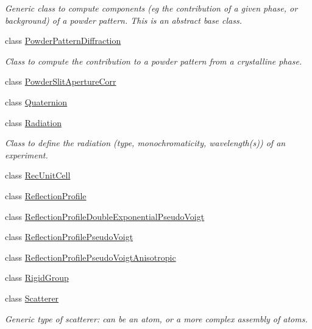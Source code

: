 \begin{DoxyCompactItemize}
\begin{DoxyCompactList}\small\item\em Generic class to compute components (eg the contribution of a given phase, or background) of a powder pattern. This is an abstract base class. \end{DoxyCompactList}\item 
class \mbox{\hyperlink{class_obj_cryst_1_1_powder_pattern_diffraction}{Powder\+Pattern\+Diffraction}}
\begin{DoxyCompactList}\small\item\em Class to compute the contribution to a powder pattern from a crystalline phase. \end{DoxyCompactList}\item 
class \mbox{\hyperlink{class_obj_cryst_1_1_powder_slit_aperture_corr}{Powder\+Slit\+Aperture\+Corr}}
\item 
class \mbox{\hyperlink{class_obj_cryst_1_1_quaternion}{Quaternion}}
\item 
class \mbox{\hyperlink{class_obj_cryst_1_1_radiation}{Radiation}}
\begin{DoxyCompactList}\small\item\em Class to define the radiation (type, monochromaticity, wavelength(s)) of an experiment. \end{DoxyCompactList}\item 
class \mbox{\hyperlink{class_obj_cryst_1_1_rec_unit_cell}{Rec\+Unit\+Cell}}
\item 
class \mbox{\hyperlink{class_obj_cryst_1_1_reflection_profile}{Reflection\+Profile}}
\item 
class \mbox{\hyperlink{class_obj_cryst_1_1_reflection_profile_double_exponential_pseudo_voigt}{Reflection\+Profile\+Double\+Exponential\+Pseudo\+Voigt}}
\item 
class \mbox{\hyperlink{class_obj_cryst_1_1_reflection_profile_pseudo_voigt}{Reflection\+Profile\+Pseudo\+Voigt}}
\item 
class \mbox{\hyperlink{class_obj_cryst_1_1_reflection_profile_pseudo_voigt_anisotropic}{Reflection\+Profile\+Pseudo\+Voigt\+Anisotropic}}
\item 
class \mbox{\hyperlink{class_obj_cryst_1_1_rigid_group}{Rigid\+Group}}
\item 
class \mbox{\hyperlink{class_obj_cryst_1_1_scatterer}{Scatterer}}
\begin{DoxyCompactList}\small\item\em Generic type of scatterer\+: can be an atom, or a more complex assembly of atoms. \end{DoxyCompactList}\item 

\end{DoxyCompactItemize}
